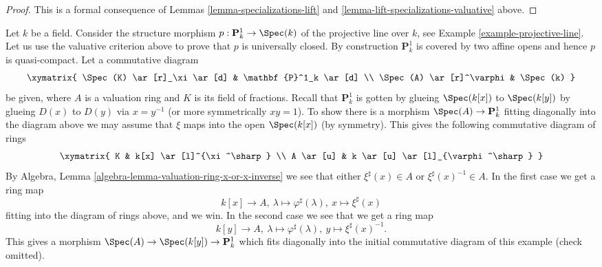 \begin{proof}
This is a formal consequence of
Lemmas \ref{lemma-specializations-lift} and
\ref{lemma-lift-specializations-valuative} above.
\end{proof}

\begin{example}
\label{example-projective-line-universally-closed}
Let $k$ be a field. Consider the structure morphism
$p : \mathbf{P}^1_k \to \Spec(k)$ of the projective
line over $k$, see Example \ref{example-projective-line}.
Let us use the valuative criterion above to prove that $p$
is universally closed.
By construction $\mathbf{P}^1_k$ is covered by two
affine opens and hence $p$ is quasi-compact.
Let a commutative diagram
$$
\xymatrix{
\Spec(K) \ar[r]_\xi \ar[d] & \mathbf{P}^1_k \ar[d] \\
\Spec(A) \ar[r]^\varphi & \Spec(k)
}
$$
be given, where $A$ is a valuation ring and $K$ is its field
of fractions. Recall that $\mathbf{P}^1_k$ is gotten by glueing
$\Spec(k[x])$ to $\Spec(k[y])$ by glueing
$D(x)$ to $D(y)$ via $x = y^{-1}$ (or more symmetrically $xy = 1$).
To show there is a morphism $\Spec(A) \to \mathbf{P}^1_k$
fitting diagonally into the diagram above we may assume that $\xi$
maps into the open $\Spec(k[x])$ (by symmetry). This gives the following
commutative diagram of rings
$$
\xymatrix{
K & k[x] \ar[l]^{\xi^\sharp} \\
A \ar[u] & k \ar[u] \ar[l]_{\varphi^\sharp}
}
$$
By Algebra, Lemma \ref{algebra-lemma-valuation-ring-x-or-x-inverse}
we see that either
$\xi^\sharp(x) \in A$ or $\xi^\sharp(x)^{-1} \in A$.
In the first case we get a ring map
$$
k[x] \to A,
\ \lambda \mapsto \varphi^\sharp(\lambda),
\  x \mapsto \xi^\sharp(x)
$$
fitting into the diagram of rings above, and we win.
In the second case we see that we get a ring map
$$
k[y] \to A,
\ \lambda \mapsto \varphi^\sharp(\lambda),
\ y \mapsto \xi^\sharp(x)^{-1}.
$$
This gives a morphism
$\Spec(A) \to \Spec(k[y]) \to \mathbf{P}^1_k$
which fits diagonally into the initial commutative diagram of this example
(check omitted).
\end{example}





























